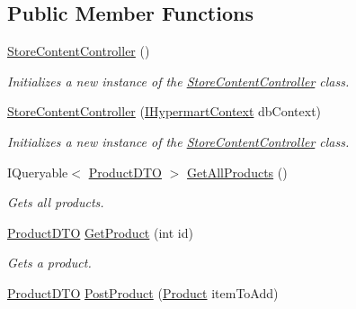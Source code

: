 \subsection*{Public Member Functions}
\begin{DoxyCompactItemize}
\item 
\hyperlink{class_open_1_1_g_i_1_1hypermart_1_1_controllers_1_1_store_content_controller_a01bad24ca04f869ec58d136ff35b2d13}{Store\+Content\+Controller} ()
\begin{DoxyCompactList}\small\item\em Initializes a new instance of the \hyperlink{class_open_1_1_g_i_1_1hypermart_1_1_controllers_1_1_store_content_controller}{Store\+Content\+Controller} class. \end{DoxyCompactList}\item 
\hyperlink{class_open_1_1_g_i_1_1hypermart_1_1_controllers_1_1_store_content_controller_ad8b3b3f13892bbb028eb21b7e240d7e2}{Store\+Content\+Controller} (\hyperlink{interface_open_1_1_g_i_1_1hypermart_1_1_d_a_l_1_1_i_hypermart_context}{I\+Hypermart\+Context} db\+Context)
\begin{DoxyCompactList}\small\item\em Initializes a new instance of the \hyperlink{class_open_1_1_g_i_1_1hypermart_1_1_controllers_1_1_store_content_controller}{Store\+Content\+Controller} class. \end{DoxyCompactList}\item 
I\+Queryable$<$ \hyperlink{class_open_1_1_g_i_1_1hypermart_1_1_data_transformation_objects_1_1_product_d_t_o}{Product\+D\+TO} $>$ \hyperlink{class_open_1_1_g_i_1_1hypermart_1_1_controllers_1_1_store_content_controller_ac0cf1a9777a6cb4978fbd1507dea8bbf}{Get\+All\+Products} ()
\begin{DoxyCompactList}\small\item\em Gets all products. \end{DoxyCompactList}\item 
\hyperlink{class_open_1_1_g_i_1_1hypermart_1_1_data_transformation_objects_1_1_product_d_t_o}{Product\+D\+TO} \hyperlink{class_open_1_1_g_i_1_1hypermart_1_1_controllers_1_1_store_content_controller_a4859d188d3e79898959e74538e832247}{Get\+Product} (int id)
\begin{DoxyCompactList}\small\item\em Gets a product. \end{DoxyCompactList}\item 
\hyperlink{class_open_1_1_g_i_1_1hypermart_1_1_data_transformation_objects_1_1_product_d_t_o}{Product\+D\+TO} \hyperlink{class_open_1_1_g_i_1_1hypermart_1_1_controllers_1_1_store_content_controller_ac11817b427cdc3139f1a1022791d9697}{Post\+Product} (\hyperlink{class_open_1_1_g_i_1_1hypermart_1_1_models_1_1_product}{Product} item\+To\+Add)

\end{DoxyCompactItemize}

